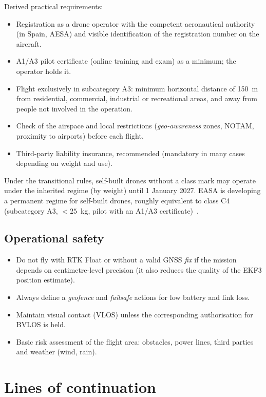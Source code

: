 Derived practical requirements:
\begin{itemize}
    \item Registration as a drone operator with the competent aeronautical authority (in Spain, AESA) and visible identification of the registration number on the aircraft.
    \item A1/A3 pilot certificate (online training and exam) as a minimum; the operator holds it.
    \item Flight exclusively in subcategory A3: minimum horizontal distance of 150~m from residential, commercial, industrial or recreational areas, and away from people not involved in the operation.
    \item Check of the airspace and local restrictions (\emph{geo-awareness} zones, NOTAM, proximity to airports) before each flight.
    \item Third-party liability insurance, recommended (mandatory in many cases depending on weight and use).
\end{itemize}

Under the transitional rules, self-built drones without a class mark may operate under the inherited regime (by weight) until 1 January 2027. EASA is developing a permanent regime for self-built drones, roughly equivalent to class C4 (subcategory A3, $<25$~kg, pilot with an A1/A3 certificate)~\cite{easa_open_category}.

\subsection{Operational safety}

\begin{itemize}
    \item Do not fly with RTK Float or without a valid GNSS \emph{fix} if the mission depends on centimetre-level precision (it also reduces the quality of the EKF3 position estimate).
    \item Always define a \emph{geofence} and \emph{failsafe} actions for low battery and link loss.
    \item Maintain visual contact (VLOS) unless the corresponding authorisation for BVLOS is held.
    \item Basic risk assessment of the flight area: obstacles, power lines, third parties and weather (wind, rain).
\end{itemize}

\section{Lines of continuation}
\label{sec:treball-futur}

